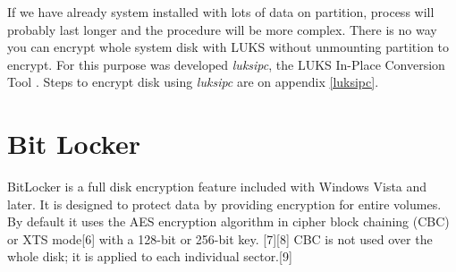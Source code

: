 If we have already system installed with lots of data on partition, process will probably last longer and the procedure will be more complex.
There is no way you can encrypt whole system disk with LUKS without unmounting partition to encrypt.
For this purpose was developed {\it luksipc}, the LUKS In-Place Conversion Tool \cite{luksipc}.
Steps to encrypt disk using {\it luksipc} are on appendix \ref{luksipc}.

\section{Bit Locker} 

BitLocker is a full disk encryption feature included with Windows Vista and later.
It is designed to protect data by providing encryption for entire volumes.
By default it uses the AES encryption algorithm in cipher block chaining (CBC) or XTS mode[6] with a 128-bit or 256-bit key.
[7][8] CBC is not used over the whole disk; it is applied to each individual sector.[9]
